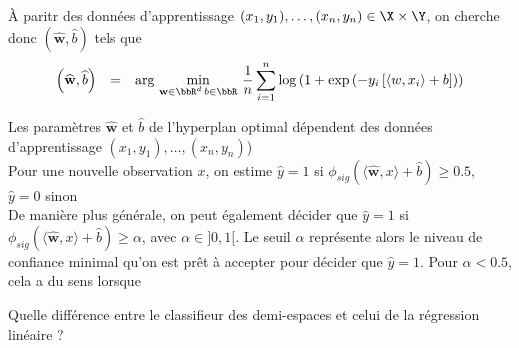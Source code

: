 \documentclass[10pt]{beamer}
\newcommand{\hsp}{\hspace*{1em}}
\begin{document}
\begin{frame}
À paritr des données d'apprentissage $(x_1,y_1), \dots, (x_n, y_n) \in \X \times \Y$, on cherche donc $ \left(\widehat{\mathbf{w}},\widehat{b}\right)$ tels que\\[1.5em]


$$\begin{array}{lll}
	 \left(\widehat{\mathbf{w}},\widehat{b}\right)&=& 
	 	\text{{arg}}\,\min\limits_{\mathbf{w} \in \bbR^d \, b \in \bbR}\, \dfrac{1}{n}  \displaystyle \sum_{i=1}^n  \log\left(1+ \exp\left(-y_i\left[\langle w,x_i\rangle +b\right]\right)\right)
\end{array}$$

\vspace{2em}

 \hsp Les paramètres $\widehat{\mathbf{w}}$ et $\widehat{b}$ de l'hyperplan optimal dépendent des données d'apprentissage $(x_1,y_1), \dots, (x_n, y_n)$)\\[1em]

Pour une nouvelle observation $x$, on estime $\hat{y} =1$ si  $\phi_{sig}\left( \langle \widehat{\mathbf{w}},x \rangle + \widehat{b}\right) \geq 0.5$, $\hat{y} =0$ sinon \\[1em]

De manière plus générale, on peut également décider que $\hat{y} =1$ si  $\phi_{sig}\left( \langle \widehat{\mathbf{w}},x \rangle + \widehat{b}\right) \geq \alpha$, avec $\alpha \in ]0,1[$. Le seuil $\alpha$ représente alors le niveau de confiance minimal qu'on est prêt à accepter pour décider que $\hat{y} =1$. Pour \eg $\alpha < 0.5$, cela a du sens lorsque\\[4em]

\end{frame}


\begin{frame}
Quelle différence entre le classifieur des demi-espaces et celui de la régression linéaire ?\\[24em]
\end{frame}
\end{document}
